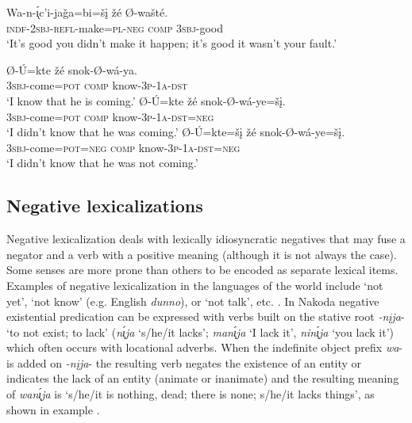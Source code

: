 \documentclass[output=paper,colorlinks,citecolor=brown]{langscibook}
\begin{document}
\ea\label{ex:nak:31}
    \gll Wa-n-\'{\k{ı}}c’i-jaǧa=bi=šį žé Ø-wašté. \\
         \textsc{indf}-2\textsc{sbj-refl}-make=\textsc{pl-neg} \textsc{comp} \textsc{3sbj}-good \\
    \glt ‘It’s good you didn’t make it happen; it’s good it wasn’t your fault.’ \citep[415]{Cumberland2005}
\z 

\ea\label{ex:nak:32}
    \ea\label{ex:nak:32a}
        \gll Ø-\'{U}=kte žé snok-Ø-wá-ya. \\ 
             \textsc{3sbj}-come=\textsc{pot} \textsc{comp} know-\textsc{3p-1a-dst} \\
        \glt ‘I know that he is coming.’
    \ex\label{ex:nak:32b}
        \gll Ø-\'{U}=kte žé snok-Ø-wá-ye=šį. \\
             \textsc{3sbj}-come=\textsc{pot} \textsc{comp} know-\textsc{3p-1a-dst=neg} \\
        \glt ‘I didn’t know that he was coming.’
    \ex\label{ex:nak:32c}
        \gll Ø-\'{U}=kte=šį žé snok-Ø-wá-ye=šį. \\
             \textsc{3sbj}-come=\textsc{pot=neg} \textsc{comp} know-\textsc{3p-1a-dst=neg} \\
        \glt ‘I didn’t know that he was not coming.’
    \z
\z 

\subsection{Negative lexicalizations}\label{sec:nak:2.5}

Negative lexicalization deals with lexically idiosyncratic negatives that may fuse a negator and a verb with a positive meaning (although it is not always the case). Some senses are more prone than others to be encoded as separate lexical items. Examples of negative lexicalization in the languages of the world include ‘not yet’, ‘not know’ (e.g. English \textit{dunno}), or ‘not talk’, etc. \citep[see][137]{Veselinova2013neg.exist}. In Nakoda negative existential predication can be expressed with verbs built on the stative root \textit{-nįja}- ‘to not exist; to lack’ (\textit{n\'{\k{ı}}ja} ‘s/he/it lacks’; \textit{man\'{\k{ı}}ja} ‘I lack it’, \textit{nin\'{\k{ı}}ja} ‘you lack it’) which often occurs with locational adverbs. When the indefinite object prefix \textit{wa}- is added on \textit{-nįja}- the resulting verb negates the existence of an entity or indicates the lack of an entity (animate or inanimate) and the resulting meaning of \textit{wan\'{\k{ı}}ja} is ‘s/he/it is nothing, dead; there is none; s/he/it lacks things’, as shown in example .
\end{document}
